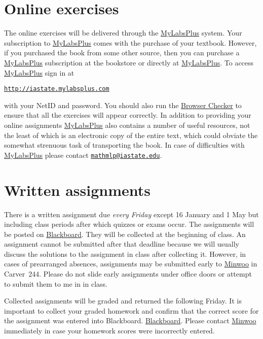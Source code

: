 \documentclass[11pt]{article}
\begin{document}
\section{Online exercises}\label{Online}
The online exercises will be delivered through the
\href{http://iastate.mylabsplus.com}{MyLabsPlus} system.
Your subscription to 
\href{http://iastate.mylabsplus.com}{MyLabsPlus}
comes with the purchase of your textbook.
However, if you purchased the book from some other source,
then you can purchase a 
\href{http://iastate.mylabsplus.com}{MyLabsPlus}
subscription at the bookstore or directly at
\href{http://iastate.mylabsplus.com}{MyLabsPlus}.
To access
\href{http://iastate.mylabsplus.com}{MyLabsPlus}
sign in at
\begin{center}
\href{http://iastate.mylabsplus.com}{\tt http://iastate.mylabsplus.com}
\end{center}
with your NetID and password.
You should also run the
\href{https://www.mathxl.com/BrowserCheck/BrowserCheck.aspx?appproductid=3&courseid=2744761&handler_urn=pearson%2fmlp_mml_xl%2fslink%2fx-pearson-mlp_mml_xl&productid=ccng}{Browser Checker}
to ensure that all the exercises will appear correctly.
In addition to providing your online assignments
\href{http://iastate.mylabsplus.com}{MyLabsPlus}
also contains a number of useful resources, not the least of which is an
electronic copy of the entire text, which could obviate
the somewhat strenuous task of transporting the book.
In case of difficulties
with \href{http://iastate.mylabsplus.com}{MyLabsPlus} please contact
\href{mailto://mathmlp@iastate.edu}{\tt mathmlp@iastate.edu}.

\section{Written assignments}\label{Written}
There is a written assignment due {\em every 
Friday} except 16 January and 1 May
but including class periods
after which quizzes or exams occur.
The assignments will be posted on \href{https://bb.its.iastate.edu}{Blackboard}.
They will be collected at the beginning
of class. An assignment cannot be submitted after that deadline
because we will usually discuss the solutions to the assignment
in class after collecting it.
However, in cases of prearranged absences, assignments may be submitted
early to \href{mailto:mws@iastate.edu}{Minwoo} in Carver~244.
Please do not slide early assignments under office doors or attempt
to submit them to me in in class.

Collected assignments will be graded and returned the following Friday.
It is important to collect your graded homework and confirm that the correct
score for the assignment was entered into Blackboard.
\href{https://bb.its.iastate.edu}{Blackboard}. Please contact
\href{mailto:mws@iastate.edu}{Minwoo} immediately in case your homework scores
were incorrectly entered.
\end{document}
